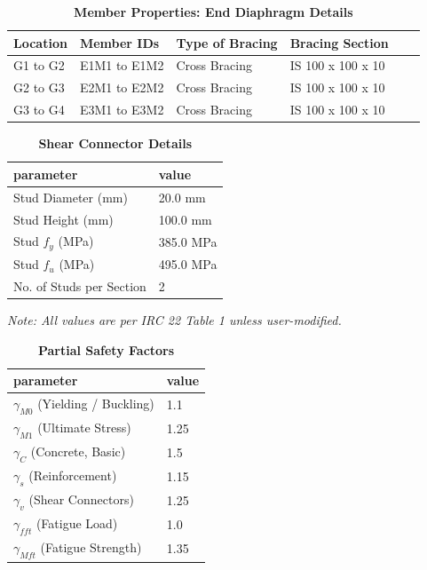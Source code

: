 \documentclass[12pt,a4paper]{report}
\numberwithin{table}{chapter}
\numberwithin{figure}{chapter}
\begin{document}
\begin{longtable}{|L{2.2cm}|L{2.2cm}|L{3.0cm}|L{2.5cm}|C{1.8cm}|C{1.8cm}|}
\caption{\textbf{Member Properties: End Diaphragm Details}}
\hline
\textbf{Location} & \textbf{Member IDs} & \textbf{Type of Bracing} & \textbf{Bracing Section} \\
\hline
G1 to G2 & E1M1 to E1M2 & Cross Bracing & IS 100 x 100 x 10 \\[6pt]
\hline
G2 to G3 & E2M1 to E2M2 & Cross Bracing & IS 100 x 100 x 10 \\[6pt]
\hline
G3 to G4 & E3M1 to E3M2 & Cross Bracing & IS 100 x 100 x 10 \\[6pt]
\hline
\end{longtable}



\label{subsec:shear-connectors}

\vspace{2.2em}

\vspace{0.4em}
\begin{longtable}{|L{5.5cm}|p{10.0cm}|}
\caption{\textbf{Shear Connector Details}}
\hline
\textbf{parameter} & \textbf{value} \\
\hline
\textnormal{Stud Diameter (mm)} & 20.0 mm \\[6pt]
\hline
\textnormal{Stud Height (mm)} & 100.0 mm \\[6pt]
\hline
\textnormal{Stud $f_y$ (MPa)} & 385.0 MPa \\[6pt]
\hline
\textnormal{Stud $f_u$ (MPa)} & 495.0 MPa \\[6pt]
\hline
\textnormal{No. of Studs per Section} & 2 \\[6pt]
\hline
\end{longtable}



\label{subsec:safety-factors}

\vspace{2.2em}

\vspace{0.3em}
\noindent\textit{Note: All values are per IRC 22 Table 1 unless user-modified.}

\vspace{0.4em}
\begin{longtable}{|L{5.5cm}|p{10.0cm}|}
\caption{\textbf{Partial Safety Factors}}
\hline
\textbf{parameter} & \textbf{value} \\
\hline
\textnormal{$\gamma_{M0}$ (Yielding / Buckling)} & 1.1 \\[6pt]
\hline
\textnormal{$\gamma_{M1}$ (Ultimate Stress)} & 1.25 \\[6pt]
\hline
\textnormal{$\gamma_C$ (Concrete, Basic)} & 1.5 \\[6pt]
\hline
\textnormal{$\gamma_s$ (Reinforcement)} & 1.15 \\[6pt]
\hline
\textnormal{$\gamma_v$ (Shear Connectors)} & 1.25 \\[6pt]
\hline
\textnormal{$\gamma_{fft}$ (Fatigue Load)} & 1.0 \\[6pt]
\hline
\textnormal{$\gamma_{Mft}$ (Fatigue Strength)} & 1.35 \\[6pt]
\hline
\end{longtable}
\end{document}
